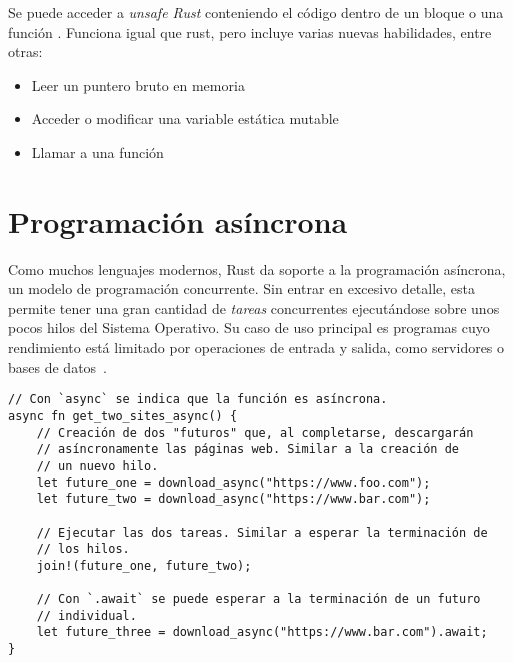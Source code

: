 Se puede acceder a \emph{unsafe Rust} conteniendo el código dentro de un bloque
 o una función .
Funciona igual que rust, pero incluye varias nuevas habilidades, entre otras:

\begin{itemize}
    \item Leer un puntero bruto en memoria

    \item Acceder o modificar una variable estática mutable

    \item Llamar a una función \unsafe

\end{itemize}

\section{Programación asíncrona}

Como muchos lenguajes modernos, Rust da soporte a la programación asíncrona, un
modelo de programación concurrente. Sin entrar en excesivo detalle, esta permite
tener una gran cantidad de \emph{tareas} concurrentes ejecutándose sobre unos
pocos hilos del Sistema Operativo. Su caso de uso principal es programas cuyo
rendimiento está limitado por operaciones de entrada y salida, como servidores o
bases de datos~\cite{rustasyncbook}.

\begin{verbatim}
// Con `async` se indica que la función es asíncrona.
async fn get_two_sites_async() {
    // Creación de dos "futuros" que, al completarse, descargarán
    // asíncronamente las páginas web. Similar a la creación de
    // un nuevo hilo.
    let future_one = download_async("https://www.foo.com");
    let future_two = download_async("https://www.bar.com");

    // Ejecutar las dos tareas. Similar a esperar la terminación de
    // los hilos.
    join!(future_one, future_two);

    // Con `.await` se puede esperar a la terminación de un futuro
    // individual.
    let future_three = download_async("https://www.bar.com").await;
}
\end{verbatim}
